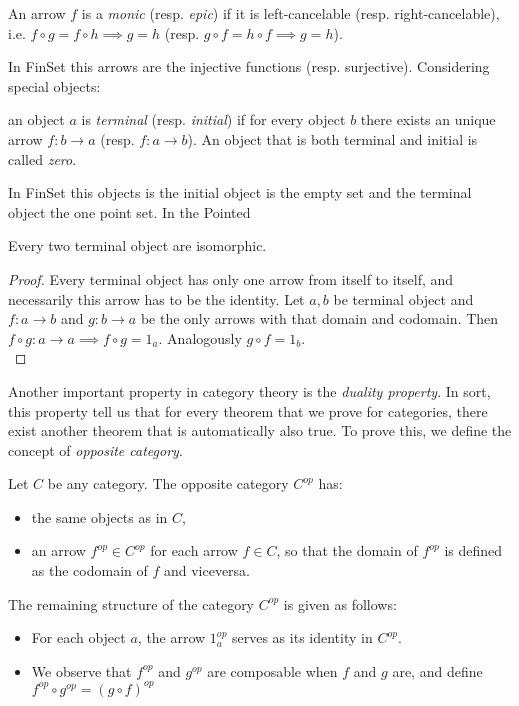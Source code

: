 \begin{definition} An arrow $f$ is a \emph{monic} (resp. \emph{epic}) if it is left-cancelable (resp. right-cancelable), i.e.  $f\circ g = f \circ h \implies g = h$ (resp. $g\circ f = h \circ f \implies g = h$).
\end{definition}


 
In FinSet this arrows are the injective functions (resp. surjective). Considering special objects:

\begin{definition}
  an object $a$ is \emph{terminal} (resp. \emph{initial}) if for every object $b$ there exists an unique arrow $f:b\to a$ (resp. $f:a\to b$).  An object that is both terminal and initial is called \emph{zero}.
\end{definition}

  In FinSet this objects is the initial object is the  empty set and the terminal object the one point set. In the Pointed 

\begin{proposition}\label{terminal-proposition}
  Every two terminal object are isomorphic.
\end{proposition}
\begin{proof}
 Every terminal object has only one arrow from itself to itself, and necessarily this arrow has to be the identity. Let $a, b$ be terminal object and $f:a\to b$ and $g:b\to a$ be the only arrows with that domain and codomain. Then $f\circ g : a \to a \implies f \circ g = 1_a$. Analogously $g \circ f = 1_b$.\\
\end{proof}

Another important property in category theory is the \emph{duality property}. In sort, this property tell us that for every theorem that we prove for categories, there exist another theorem that is automatically also true. To prove this, we define the concept of \emph{opposite category}.


\begin{definition}
  Let $C$ be any category. The opposite category $C^{op}$ has:
  \begin{itemize}
  \item the same objects as in $C$,
  \item an arrow $f^{op}\in C^{op}$ for each arrow $f \in C$, so that the domain of $f^{op}$ is defined as the codomain of $f$ and viceversa.
  \end{itemize}
  The remaining structure of the category $C^{op}$ is given as follows:
  \begin{itemize}
  \item For each object $a$, the arrow $1_a^{op}$ serves as its identity in $C^{op}$.
  \item We observe that $f^{op}$ and $g^{op}$ are composable when $f$ and $g$ are, and define $f^{op} \circ g^{op} = (g \circ f)^{op}$
  \end{itemize}
\end{definition}


